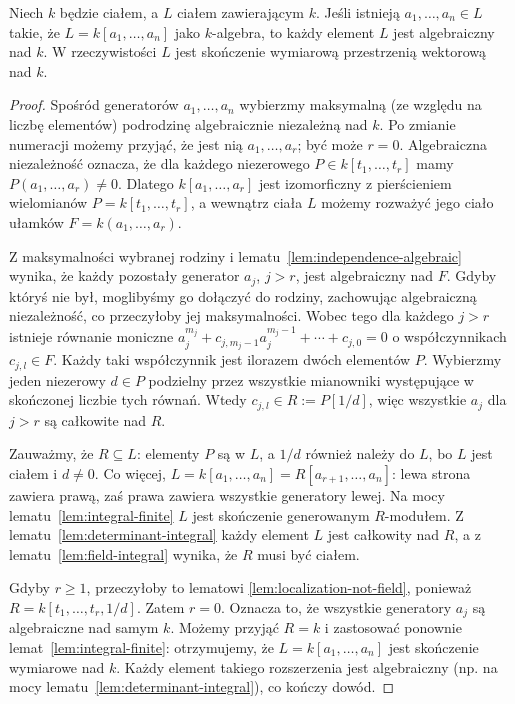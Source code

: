 \begin{twierdzenie}
\label{tw:zariski-lemma}
Niech $k$ będzie ciałem, a $L$ ciałem zawierającym $k$.
Jeśli istnieją $a_1,\dots,a_n\in L$ takie, że
$L=k[a_1,\dots,a_n]$ jako $k$-algebra, to każdy element $L$
jest algebraiczny nad $k$. W rzeczywistości $L$ jest
skończenie wymiarową przestrzenią wektorową nad $k$.
\end{twierdzenie}
\begin{proof}
Spośród generatorów $a_1,\dots,a_n$ wybierzmy maksymalną
(ze względu na liczbę elementów) podrodzinę algebraicznie
niezależną nad $k$. Po zmianie numeracji możemy przyjąć,
że jest nią $a_1,\dots,a_r$; być może $r=0$.
Algebraiczna niezależność oznacza, że dla każdego
niezerowego $P\in k[t_1,\dots,t_r]$ mamy
$P(a_1,\dots,a_r)\ne0$.
Dlatego $k[a_1,\dots,a_r]$ jest izomorficzny z
pierścieniem wielomianów $P=k[t_1,\dots,t_r]$,
a wewnątrz ciała $L$ możemy rozważyć jego ciało ułamków
$F=k(a_1,\dots,a_r)$.

Z maksymalności wybranej rodziny i
lematu~\ref{lem:independence-algebraic} wynika, że każdy
pozostały generator $a_j$, $j>r$, jest algebraiczny nad $F$.
Gdyby któryś nie był, moglibyśmy go dołączyć do rodziny,
zachowując algebraiczną niezależność, co przeczyłoby jej
maksymalności. Wobec tego dla każdego $j>r$ istnieje
równanie moniczne
$ a_j^{m_j}+c_{j,m_j-1}a_j^{m_j-1}+\cdots+c_{j,0}=0$
o współczynnikach $c_{j,l}\in F$.
Każdy taki współczynnik jest ilorazem dwóch elementów $P$.
Wybierzmy jeden niezerowy $d\in P$ podzielny przez wszystkie
mianowniki występujące w skończonej liczbie tych równań.
Wtedy $c_{j,l}\in R:=P[1/d]$, więc wszystkie $a_j$ dla $j>r$
są całkowite nad $R$.

Zauważmy, że $R\subseteq L$: elementy $P$ są w $L$,
a $1/d$ również należy do $L$, bo $L$ jest ciałem i $d\ne0$.
Co więcej,
$L=k[a_1,\dots,a_n]=R[a_{r+1},\dots,a_n]$:
lewa strona zawiera prawą, zaś prawa zawiera wszystkie generatory
lewej. Na mocy lematu~\ref{lem:integral-finite}
$L$ jest skończenie generowanym $R$-modułem.
Z lematu~\ref{lem:determinant-integral} każdy element $L$
jest całkowity nad $R$, a z lematu~\ref{lem:field-integral}
wynika, że $R$ musi być ciałem.

Gdyby $r\ge1$, przeczyłoby to lematowi
\ref{lem:localization-not-field}, ponieważ
$R=k[t_1,\dots,t_r,1/d]$. Zatem $r=0$.
Oznacza to, że wszystkie generatory $a_j$ są algebraiczne nad
samym $k$. Możemy przyjąć $R=k$ i zastosować ponownie
lemat~\ref{lem:integral-finite}: otrzymujemy, że
$L=k[a_1,\dots,a_n]$ jest skończenie wymiarowe nad $k$.
Każdy element takiego rozszerzenia jest algebraiczny
(np. na mocy lematu~\ref{lem:determinant-integral}), co kończy dowód.
\end{proof}

